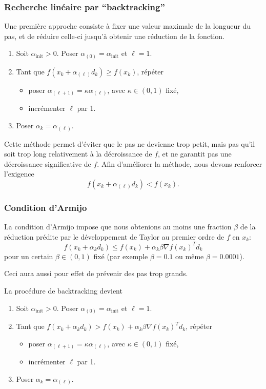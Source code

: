 \documentclass[usepdftitle=false]{beamer}
\def\blue{\color{blue}}
\begin{document}
\begin{frame}
\frametitle{Recherche linéaire par ``backtracking''}

Une première approche consiste à fixer une valeur maximale de la longueur du pas, et de réduire celle-ci jusqu'à obtenir une réduction de la fonction.

\begin{enumerate}
\item
Soit $\alpha_{\mbox{init}} > 0$. Poser $\alpha_{(0)} = \alpha_{\mbox{init}}$ et $\ell = 1$.
\item
Tant que $f(x_k + \alpha_{(\ell)} d_k ) \geq f(x_k)$, répéter
\begin{itemize}
\item 
poser $\alpha_{(\ell+1)} = \kappa \alpha_{(\ell)}$, avec $\kappa \in (0, 1)$ fixé,
\item
incrémenter $\ell$ par 1.
\end{itemize}
\item
Poser $\alpha_k = \alpha_{(\ell)}$.
\end{enumerate}

Cette méthode permet d'éviter que le pas ne devienne trop petit, mais pas qu'il soit trop long relativement à la décroissance de $f$, et ne garantit pas une décroissance significative de $f$.
Afin d'améliorer la méthode, nous devons renforcer l'exigence
$$
f(x_k + \alpha_{(\ell)} d_k ) < f(x_k).
$$

\end{frame}

\begin{frame}
\frametitle{Condition d'Armijo}

La {\blue condition d'Armijo} impose que nous obtenions au moins une fraction $\beta$ de la réduction prédite par le développement de Taylor au premier ordre de $f$ en $x_k$:
$$
f(x_k + \alpha_k d_k ) \leq f(x_k) + \alpha_k \beta \nabla f(x_k)^T d_k
$$
pour un certain $\beta \in (0, 1)$ fixé (par exemple $\beta = 0.1$ ou même $\beta = 0.0001$).

Ceci aura aussi pour effet de prévenir des pas trop grands.

La procédure de backtracking devient
\begin{enumerate}
	\item
	Soit $\alpha_{\mbox{init}} > 0$. Poser $\alpha_{(0)} = \alpha_{\mbox{init}}$ et $\ell = 1$.
	\item
	Tant que
	$f(x_k + \alpha_k d_k ) > f(x_k) + \alpha_k \beta \nabla f(x_k)^T d_k$, répéter
	\begin{itemize}
		\item 
		poser $\alpha_{(\ell+1)} = \kappa \alpha_{(\ell)}$, avec $\kappa \in (0, 1)$ fixé,
		\item
		incrémenter $\ell$ par 1.
	\end{itemize}
	\item
	Poser $\alpha_k = \alpha_{(\ell)}$.
\end{enumerate}

\end{frame}
\end{document}
